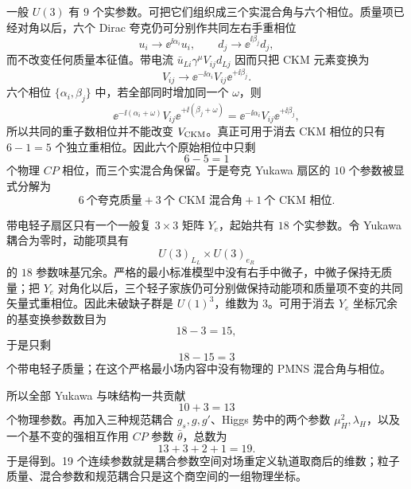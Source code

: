 \begin{derivation}[场重定义后的独立物理参数]
一般 $U(3)$ 有 $9$ 个实参数。可把它们组织成三个实混合角与六个相位。质量项已经对角以后，六个 Dirac 夸克仍可分别作共同左右手重相位
\begin{equation*}
 u_i\to \ee^{\ii\alpha_i}u_i,
 \qquad
 d_j\to \ee^{\ii\beta_j}d_j,
\end{equation*}
而不改变任何质量本征值。带电流
$\bar u_{Li}\gamma^\mu V_{ij}d_{Lj}$ 因而只把 CKM 元素变换为
\begin{equation*}
 V_{ij}\longrightarrow
 \ee^{-\ii\alpha_i}V_{ij}\ee^{+\ii\beta_j}.
\end{equation*}
六个相位 $\{\alpha_i,\beta_j\}$ 中，若全部同时增加同一个 $\omega$，则
\begin{equation*}
 \ee^{-\ii(\alpha_i+\omega)}V_{ij}
 \ee^{+\ii(\beta_j+\omega)}
 =\ee^{-\ii\alpha_i}V_{ij}\ee^{+\ii\beta_j},
\end{equation*}
所以共同的重子数相位并不能改变 $V_{\rm CKM}$。真正可用于消去 CKM 相位的只有 $6-1=5$ 个独立重相位。因此六个原始相位中只剩
\begin{equation*}
 6-5=1
\end{equation*}
个物理 $CP$ 相位，而三个实混合角保留。于是夸克 Yukawa 扇区的 $10$ 个参数被显式分解为
\begin{equation*}
 {6\ \text{个夸克质量}
 +3\ \text{个 CKM 混合角}
 +1\ \text{个 CKM 相位}.}
\end{equation*}

带电轻子扇区只有一个一般复 $3\times3$ 矩阵 $Y_e$，起始共有 $18$ 个实参数。令 Yukawa 耦合为零时，动能项具有
\begin{equation*}
 U(3)_{L_L}\times U(3)_{e_R}
\end{equation*}
的 $18$ 参数味基冗余。严格的最小标准模型中没有右手中微子，中微子保持无质量；把 $Y_e$ 对角化以后，三个轻子家族仍可分别做保持动能项和质量项不变的共同矢量式重相位。因此未破缺子群是 $U(1)^3$，维数为 $3$。可用于消去 $Y_e$ 坐标冗余的基变换参数数目为
\begin{equation*}
 18-3=15,
\end{equation*}
于是只剩
\begin{equation*}
 18-15=3
\end{equation*}
个带电轻子质量；在这个严格最小场内容中没有物理的 PMNS 混合角与相位。

所以全部 Yukawa 与味结构一共贡献
\begin{equation*}
 10+3=13
\end{equation*}
个物理参数。再加入三种规范耦合 $g_s,g,g'$、Higgs 势中的两个参数 $\mu_H^2,\lambda_H$，以及一个基不变的强相互作用 $CP$ 参数 $\bar\theta$，总数为
\begin{equation*}
 13+3+2+1=19.
\end{equation*}
于是得到。19 个连续参数就是耦合参数空间对场重定义轨道取商后的维数；粒子质量、混合参数和规范耦合只是这个商空间的一组物理坐标。
\end{derivation}

